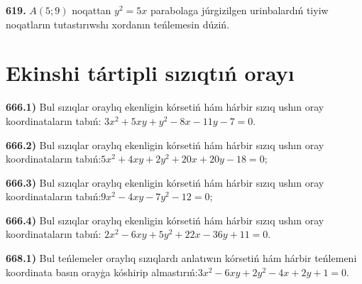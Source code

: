\textbf {619.} $A (5;9) $ noqattan $y^2=5x$ parabolaga júrgizilgen urinbalardıń tiyiw noqatların tutastırıwshı xordanın teńlemesin dúziń.


\section{ Ekinshi tártipli sızıqtıń orayı }

\textbf{666.1)} Bul sızıqlar oraylıq ekenligin kórsetiń hám hárbir sızıq ushın oray koordinataların tabıń: $3x^2+5xy+y^2-8x-11y-7=0$.

\textbf{666.2)} Bul sızıqlar oraylıq ekenligin kórsetiń hám hárbir sızıq ushın oray koordinataların tabıń:$5 x^2+4 x y+2 y^2+20 x+20 y-18=0$;

\textbf{666.3)} Bul sızıqlar oraylıq ekenligin kórsetiń hám hárbir sızıq ushın oray koordinataların tabıń:$9 x^2-4 x y-7 y^2-12=0$;

\textbf{666.4)} Bul sızıqlar oraylıq ekenligin kórsetiń hám hárbir sızıq ushın oray koordinataların tabıń: $2 x^2-6 x y+5 y^2+22 x-36 y+11=0$.

\textbf{668.1)} Bul teńlemeler oraylıq sızıqlardı anlatıwın kórsetiń hám hárbir teńlemeni koordinata basın orayģa kóshirip almastırıń:$3x^2-6xy+2y^2-4x+2y+1=0$.

